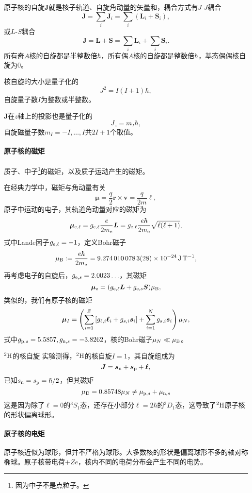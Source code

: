 原子核的自旋$\bm J$就是核子轨道、自旋角动量的矢量和，耦合方式有$J$-$J$耦合
\[
	\bm J=\sum_i\bm J_i=\sum_i(\bm L_i+\bm S_i),
\]
或$L$-$S$耦合
\[
	\bm J=\bm L+\bm S=\sum_i\bm L_i+\sum_i\bm S_i.
\]
所有奇$A$核的自旋都是半整数倍$\hbar$，所有偶$A$核的自旋都是整数倍$\hbar$，基态偶偶核自旋为0。

核自旋的大小是量子化的
\[
	J^2=I(I+1)\hbar,
\]
自旋量子数$I$为整数或半整数。

$\bm J$在$z$轴上的投影也是量子化的
\[
	J_z=m_I\hbar,
\]
自旋磁量子数$m_I=-I,\ldots,I$共$2I+1$个取值。
\paragraph{原子核的磁矩}质子、中子\footnote{因为中子不是点粒子。}的磁矩，以及质子运动产生的磁矩。

在经典力学中，磁矩与角动量有关
\[
	\bm\mu=\frac{q}2\bm r\times\bm v=\frac{q}{2m}\bm\ell,
\]
原子中运动的电子，其轨道角动量对应的磁矩为
\[
	\bm\mu_{\elc,\ell}=g_{\elc,\ell}\frac{e}{2m_\elc}\bm L=g_{\elc,\ell}\frac{e\hbar}{2m_\elc}\sqrt{\ell(\ell+1)},
\]
式中Lande因子$g_{\elc,\ell}=-1$，定义Bohr磁子
\[
	\muB:=\frac{e\hbar}{2m_\elc}=\SI[separate-uncertainty = false]{9.2740100783(28)e-24}{J.T^{-1}},
\]
再考虑电子的自旋后，$g_{\elc,s}=2.0023\ldots$，其磁矩
\[
	\bm\mu_\elc=(g_{\elc,\ell}\bm L+g_{\elc,s}\bm S)\muB,
\]
类似的，我们有原子核的磁矩
\[
	\bm\mu_I=\kh{\sum_{i=1}^Z\fkh{g_{\ell,i}\bm\ell_i+g_{s,i}\bm s_i}+\sum_{i=1}^Ng_{s,i}\bm s_i}\mu_N,
\]
式中$g_{\pton,s}=5.5857,g_{\nton,s}=-3.8262$，核的Bohr磁子$\mu_N\ll\muB$。
\begin{example}{$\nucli2H$的核自旋}{}
	实验测得，$\nucli2H$的核自旋$I=1$，其自旋组成为
	\[
		\bm J=\bm s_\nton+\bm s_\pton+\bm\ell,
	\]
	已知$s_\nton=s_\pton=\hbar/2$，但其磁矩
	\[
		\mu_{\nuc D}=0.85748\mu_N\neq\mu_{\pton,s}+\mu_{\nton,s}
	\]
	这是因为除了$\ell=0$的$^3S_1$态，还存在小部分$\ell=2\hbar$的$^3D_1$态，这导致了$\nucli2H$原子核的形状偏离球形。
\end{example}
\paragraph{原子核的电矩}原子核近似为球形，但并不严格为球形。大多数核的形状是偏离球形不多的轴对称椭球。原子核带电荷$+Ze$，核内不同的电荷分布会产生不同的电势。

